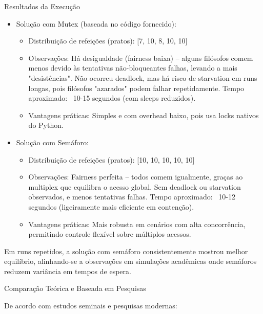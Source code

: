 Resultados da Execução

\begin{itemize}
    \item Solução com Mutex (baseada no código fornecido):
    \begin{itemize}
        \item Distribuição de refeições (pratos): [7, 10, 8, 10, 10]
        \item Observações: Há desigualdade (fairness baixa) – alguns filósofos comem menos devido às tentativas não-bloqueantes falhas, levando a mais "desistências". Não ocorreu deadlock, mas há risco de starvation em runs longas, pois filósofos "azarados" podem falhar repetidamente. Tempo aproximado: ~10-15 segundos (com sleeps reduzidos).
        \item Vantagens práticas: Simples e com overhead baixo, pois usa locks nativos do Python.
    \end{itemize}
    \item Solução com Semáforo:
    \begin{itemize}
        \item Distribuição de refeições (pratos): [10, 10, 10, 10, 10]
        \item Observações: Fairness perfeita – todos comem igualmente, graças ao multiplex que equilibra o acesso global. Sem deadlock ou starvation observados, e menos tentativas falhas. Tempo aproximado: ~10-12 segundos (ligeiramente mais eficiente em contenção).
        \item Vantagens práticas: Mais robusta em cenários com alta concorrência, permitindo controle flexível sobre múltiplos acessos.
    \end{itemize}
\end{itemize}

Em runs repetidos, a solução com semáforo consistentemente mostrou melhor equilíbrio, alinhando-se a observações em simulações acadêmicas onde semáforos reduzem variância em tempos de espera.

Comparação Teórica e Baseada em Pesquisas

De acordo com estudos seminais e pesquisas modernas:

